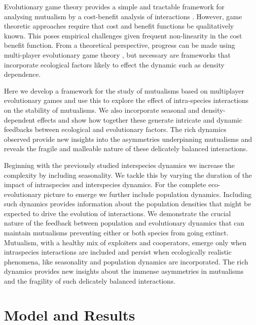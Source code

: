 \documentclass[12pt]{article}
\begin{document}
Evolutionary game theory provides a simple and tractable framework for analysing mutualism by a cost-benefit analysis of interactions \citep{trivers:QRB:1971,weibull:book:1995,hofbauer:JMB:1996,hofbauer:book:1998}. 
However, game theoretic approaches require that cost and benefit functions be qualitatively known. This poses empirical challenges given frequent non-linearity in the cost benefit function. From a theoretical perspective, progress can be made using multi-player evolutionary game theory \citep{archetti:EL:2011,archetti:JTB:2013}, but necessary are frameworks that incorporate ecological factors likely to effect the dynamic such as density dependence.

Here we develop a framework for the study of mutualisms based on multiplayer evolutionary games and use this to explore the effect of intra-species interactions on the stability of mutualisms.  We also incorporate seasonal and density-dependent effects and show how together these generate intricate and dynamic feedbacks between ecological and evolutionary factors. The rich dynamics observed provide new insights into the asymmetries underpinning mutualisms and reveals the fragile and malleable nature of these delicately balanced interactions.

Beginning with the previously studied interspecies dynamics \citep{gokhale:PRSB:2012} we increase the complexity by including seasonality. We tackle this by varying the duration of the impact of intraspecies and interspecies dynamics. For the complete eco-evolutionary picture to emerge we further include population dynamics. Including such dynamics provides information about the population densities that might be expected to drive the evolution of interactions.  We demonstrate the crucial nature of the feedback between population and evolutionary dynamics that can maintain mutualisms preventing either or both species from going extinct. Mutualism, with a healthy mix of exploiters and cooperators, emerge only when intraspecies interactions are included and persist when ecologically realistic phenomena, like seasonality and population dynamics are incorporated. The rich dynamics provides new insights about the immense asymmetries in mutualisms and the fragility of such delicately balanced interactions.


\section{Model and Results}
\end{document}
